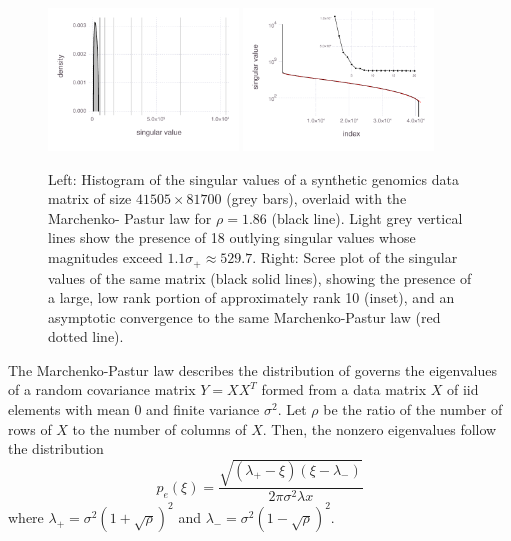 \documentclass[review]{siamart0516}
\begin{document}
\begin{figure}

\includegraphics[width=0.45\textwidth]{fig/synthetic/fig-empirical-density}
%
\includegraphics[width=0.45\textwidth]{fig/synthetic/fig-empirical-scree}

\caption{Left: Histogram of the singular values of a synthetic genomics data
matrix of size $41505\times81700$ (grey bars), overlaid with the Marchenko-
Pastur law for $\rho = 1.86$ (black line). Light grey vertical lines show the
presence of 18 outlying singular values whose magnitudes exceed
$1.1\sigma_+ \approx 529.7$.
Right: Scree plot of the singular values of the same matrix
(black solid lines), showing the presence of a large, low rank portion
of approximately rank 10 (inset), and an asymptotic convergence to the same
Marchenko-Pastur law (red dotted line).}
\label{fig:empirical-spectrum}
\end{figure}


The Marchenko-Pastur law describes the distribution of governs the eigenvalues
of a random covariance matrix $Y=XX^T$ formed from a data matrix $X$
of iid elements with mean 0 and finite variance $\sigma^2$.
Let $\rho$ be the ratio of the number of rows of $X$ to the number of columns of
$X$. Then, the nonzero eigenvalues follow the distribution
%
\begin{equation}
    \label{eq:mplaw-ev}
    p_e(\xi) = \frac {\sqrt{(\lambda_+-\xi)(\xi-\lambda_-)}} {2 \pi \sigma^2 \lambda x}
\end{equation}
%
where
$\lambda_+ = \sigma^2(1+\sqrt{\rho})^2$ and
$\lambda_- = \sigma^2(1-\sqrt{\rho})^2$.
\end{document}
